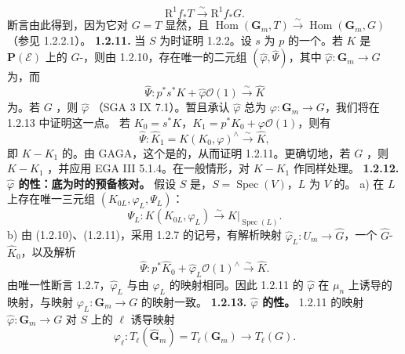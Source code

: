 \[\mathrm R^1f_*T\xrightarrow\sim\mathrm R^1f_*G.\]
断言由此得到，因为它对 $G=T$ 显然，且 $\operatorname{Hom}(\mathbf G_m,T)\xrightarrow\sim\operatorname{Hom}(\mathbf G_m,G)$（参见 1.2.2.1）。
\textbf{1.2.11.} 当 $S$ 为时证明 1.2.2。设 $s$ 为 $p$ 的一个。若 $K$ 是 $\mathbf P(\mathscr E)$ 上的 $G$-，则由 1.2.10，存在唯一的二元组 $(\widehat\varphi,\widehat\Psi)$，其中 $\widehat\varphi:\mathbf G_m\to G$ 为，而
\[\widehat\Psi:p^*s^*K+\widehat\varphi\mathscr O(1)\xrightarrow\sim\widehat K\]
为。若 $G$ ，则 $\widehat\varphi$ （SGA 3 IX 7.1）。暂且承认 $\widehat\varphi$ 总为 $\varphi:\mathbf G_m\to G$，我们将在 1.2.13 中证明这一点。
若 $K_0=s^*K$，$K_1=p^*K_0+\varphi\mathscr O(1)$，则有
\[\widehat\Psi:\widehat K_1=K(K_0,\varphi)^\wedge\xrightarrow\sim\widehat K,\]
即 $K-K_1$ 的。由 GAGA，这个是的，从而证明 1.2.11。更确切地，若 $G$ ，则 $K-K_1$ ，并应用 EGA III 5.1.4。在一般情形，对 $K-K_1$ 作同样处理。
\textbf{1.2.12. $\widehat\varphi$ 的性：底为时的预备核对。} 假设 $S$ 是，$S=\operatorname{Spec}(V)$，$L$ 为 $V$ 的。
a) 在 $L$ 上存在唯一三元组 $(K_{0L},\varphi_L,\Psi_L)$：
\[\Psi_L:K(K_{0L},\varphi_L)\xrightarrow\sim K|_{\operatorname{Spec}(L)}.\]
b) 由 (1.2.10)、(1.2.11)，采用 1.2.7 的记号，有解析映射 $\widehat\varphi_L:U_m\to\widehat G$，一个 $\widehat G$- $\widehat K_0$，以及解析
\[\widehat\Psi:p^*\widehat K_0+\widehat\varphi_L\mathscr O(1)^\wedge\xrightarrow\sim\widehat K.\]
由唯一性断言 1.2.7，$\widehat\varphi_L$ 与由 $\varphi_L$ 的映射相同。因此 1.2.11 的 $\widehat\varphi$ 在 $\mu_n$ 上诱导的映射，与映射 $\varphi_L:\mathbf G_m\to G$ 的映射一致。
\textbf{1.2.13. $\widehat\varphi$ 的性。} 1.2.11 的映射 $\widehat\varphi:\mathbf G_m\to G$ 对 $S$ 上的 $\ell$ 诱导映射
\[\varphi_\ell:T_\ell(\widehat{\mathbf G}_m)=T_\ell(\mathbf G_m)\longrightarrow T_\ell(G).\]
